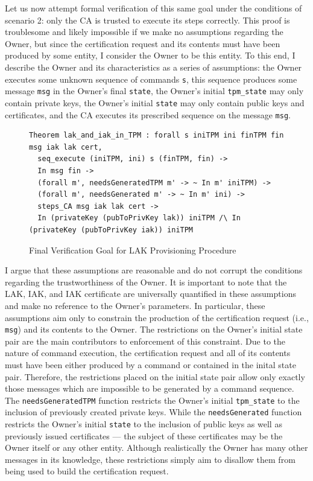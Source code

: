 \documentclass[runningheads]{llncs}
\begin{document}
Let us now attempt formal verification of this same goal under the conditions of scenario 2: only the CA is trusted to execute its steps correctly. This proof is troublesome and likely impossible if we make no assumptions regarding the Owner, but since the certification request and its contents must have been produced by some entity, I consider the Owner to be this entity.
To this end, I describe the Owner and its characteristics as a series of assumptions: the Owner executes some unknown sequence of commands \verb|s|, this sequence produces some message \verb|msg| in the Owner's final \verb|state|, the Owner's initial \verb|tpm_state| may only contain private keys, the Owner's initial \verb|state| may only contain public keys and certificates, and the CA executes its prescribed sequence on the message \verb|msg|. 
\begin{figure}[h]
\begin{lstlisting}[language=Coq]
Theorem lak_and_iak_in_TPM : forall s iniTPM ini finTPM fin msg iak lak cert,
  seq_execute (iniTPM, ini) s (finTPM, fin) -> 
  In msg fin ->
  (forall m', needsGeneratedTPM m' -> ~ In m' iniTPM) ->
  (forall m', needsGenerated m' -> ~ In m' ini) ->
  steps_CA msg iak lak cert ->
  In (privateKey (pubToPrivKey lak)) iniTPM /\ In (privateKey (pubToPrivKey iak)) iniTPM
\end{lstlisting}
\caption{Final Verification Goal for LAK Provisioning Procedure}
\label{fig:lak_goal}
\end{figure}
I argue that these assumptions are reasonable and do not corrupt the conditions regarding the trustworthiness of the Owner. It is important to note that the LAK, IAK, and IAK certificate are universally quantified in these assumptions and make no reference to the Owner's parameters. In particular, these assumptions aim only to constrain the production of the certification request (i.e., \verb|msg|) and its contents to the Owner. 
The restrictions on the Owner's initial state pair are the main contributors to enforcement of this constraint. Due to the nature of command execution, the certification request and all of its contents must have been either produced by a command or contained in the inital state pair. 
Therefore, the restrictions placed on the initial state pair allow only exactly those messages which are impossible to be generated by a command sequence.
The \verb|needsGeneratedTPM| function restricts the Owner's initial \verb|tpm_state| to the inclusion of previously created private keys. While the \verb|needsGenerated| function restricts the Owner's initial \verb|state| to the inclusion of public keys as well as previously issued certificates --- the subject of these certificates may be the Owner itself or any other entity.
Although realistically the Owner has many other messages in its knowledge, these restrictions simply aim to disallow them from being used to build the certification request. 
\end{document}
